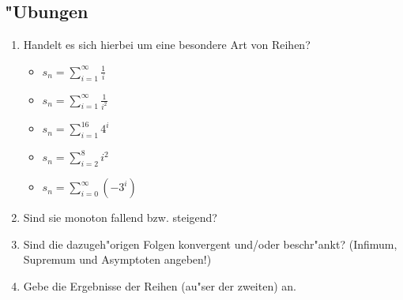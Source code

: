 \subsection{"Ubungen}
\begin{enumerate}
\item Handelt es sich hierbei um eine besondere Art von Reihen?
\begin{itemize}
\item $ s_n = \sum\limits_{i=1}^{\infty} \frac{1}{i} $
\item $ s_n = \sum\limits_{i=1}^{\infty} \frac{1}{i^2} $
\item $ s_n = \sum\limits_{i=1}^{16} 4^i$
\item $ s_n = \sum\limits_{i=2}^{8} i^2 $
\item $ s_n = \sum\limits_{i=0}^{\infty} (-3^i)$
\end{itemize}
\item Sind sie monoton fallend bzw. steigend?
\item Sind die dazugeh"origen Folgen konvergent und/oder beschr"ankt? (Infimum, Supremum und Asymptoten angeben!)
\item Gebe die Ergebnisse der Reihen (au"ser der zweiten) an.
\end{enumerate}